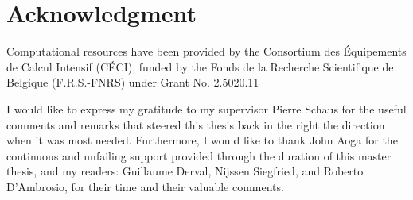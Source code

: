 \documentclass{eplmastersthesis}
\begin{document}
\clearpage
\section{Acknowledgment}

Computational resources have been provided by the Consortium des Équipements de Calcul Intensif (CÉCI), funded by the Fonds de la Recherche Scientifique de Belgique (F.R.S.-FNRS) under Grant No. 2.5020.11 \newline

I would like to express my gratitude to my supervisor Pierre Schaus for the useful comments and remarks that steered this thesis back in the right the direction when it was most needed.
Furthermore, I would like to thank John Aoga for the continuous and unfailing support provided through the duration of this master thesis, and my readers: Guillaume Derval, Nijssen Siegfried, and Roberto D'Ambrosio, for their time and their valuable comments.

\thispagestyle{empty}		
\backcoverpage
\end{document}
